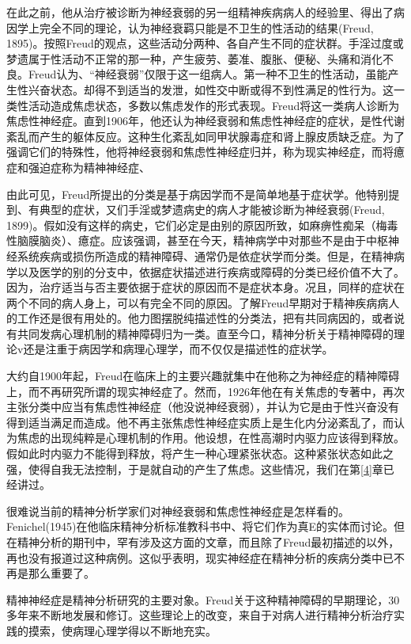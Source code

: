 \documentclass[UTF8,10pt,a4paper,openany]{book}
\begin{document}
在此之前，他从治疗被诊断为神经衰弱的另一组精神疾病病人的经验里、得出了病因学上完全不同的理论，认为神经衰羁只能是不卫生的性活动的结果(Freud, 1895)。按照Freud的观点，这些活动分两种、各自产生不同的症状群。手淫过度或梦遗属于性活动不正常的那一种，产生疲劳、萎准、腹胀、便秘、头痛和消化不良。Freud认为、“神经衰弱”仅限于这一组病人。第一种不卫生的性活动，虽能产生性兴奋状态。却得不到适当的发泄，如性交中断或得不到性满足的性行为。这一类性活动造成焦虑状态，多数以焦虑发作的形式表现。Freud将这一类病人诊断为焦虑性神经症。直到1906年，他还认为神经衰弱和焦虑性神经症的症状，是性代谢紊乱而产生的躯体反应。这种生化紊乱如同甲状腺毒症和肾上腺皮质缺乏症。为了强调它们的特殊性，他将神经衰弱和焦虑性神经症归并，称为现实神经症，而将癔症和强迫症称为精神神经症、

由此可见，Freud所提出的分类是基于病因学而不是简单地基于症状学。他特别提到、有典型的症状，又们手淫或梦遗病史的病人才能被诊断为神经衰弱(Freud, 1899)。假如没有这样的病史，它们必定是由别的原因所致，如麻痹性痴呆（梅毒性脑膜脑炎）、癔症。应该强调，甚至在今天，精神病学中对那些不是由于中枢神经系统疾病或损伤所造成的精神障碍、通常仍是依症状学而分类。但是，在精神病学以及医学的别的分支中，依据症状描述进行疾病或障碍的分类已经价值不大了。因为，治疗适当与否主要依据于症状的原因而不是症状本身。况且，同样的症状在两个不同的病人身上，可以有完全不同的原因。了解Freud早期对于精神疾病病人的工作还是很有用处的。他力图摆脱纯描述性的分类法，把有共同病因的，或者说有共同发病心理机制的精神障碍归为一类。直至今口，精神分析关于精神障碍的理论v还是注重于病因学和病理心理学，而不仅仅是描述性的症状学。

大约自1900年起，Freud在临床上的主要兴趣就集中在他称之为神经症的精神障碍上，而不再研究所谓的现实神经症了。然而，1926年他在有关焦虑的专著中，再次主张分类中应当有焦虑性神经症（他没说神经衰弱），并认为它是由于性兴奋没有得到适当满足而造成。他不再主张焦虑性神经症实质上是生化内分泌紊乱了，而认为焦虑的出现纯粹是心理机制的作用。他设想，在性高潮时内驱力应该得到释放。假如此时内驱力不能得到释放，将产生一种心理紧张状态。这种紧张状态如此之强，使得自我无法控制，于是就自动的产生了焦虑。这些情况，我们在第\ref{4}章已经讲过。

很难说当前的精神分析学家们对神经衰弱和焦虑性神经症是怎样看的。Fenichel(1945)在他临床精神分析标准教科书中、将它们作为真E的实体而讨论。但在精神分析的期刊中，罕有涉及这方面的文章，而且除了Freud最初描述的以外，再也没有报道过这种病例。这似乎表明，现实神经症在精神分析的疾病分类中已不再是那么重要了。

精神神经症是精神分析研究的主要对象。Freud关于这种精神障碍的早期理论，30多年来不断地发展和修订。这些理论上的改变，来自于对病人进行精神分析治疗实践的摸索，使病理心理学得以不断地充实。
\end{document}
